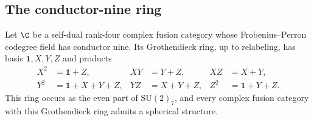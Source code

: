 \subsection{The conductor-nine ring}

\begin{theorem}\label{cub:thm:cubic-nine-ring}
Let $\C$ be a self-dual rank-four complex fusion category whose
Frobenius--Perron codegree field has conductor nine. Its Grothendieck
ring, up to relabeling, has basis $\mathbf1,X,Y,Z$ and products
\begin{equation}\label{cub:eq:cubic-nine-ring}
\begin{aligned}
 X^2&=\mathbf1+Z,& XY&=Y+Z,& XZ&=X+Y,\\
 Y^2&=\mathbf1+X+Y+Z,& YZ&=X+Y+Z,& Z^2&=\mathbf1+Y+Z.
\end{aligned}
\end{equation}
This ring occurs as the even part of $\mathrm{SU}(2)_7$, and every
complex fusion category with this Grothendieck ring admits a spherical
structure.
\end{theorem}

